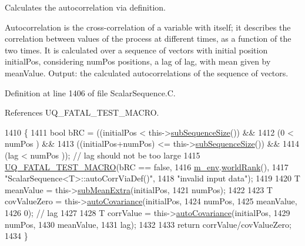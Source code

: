 Calculates the autocorrelation via definition. 

Autocorrelation is the cross-\/correlation of a variable with itself; it describes the correlation between values of the process at different times, as a function of the two times. It is calculated over a sequence of vectors with initial position {\ttfamily initial\-Pos}, considering {\ttfamily num\-Pos} positions, a lag of {\ttfamily lag}, with mean given by {\ttfamily mean\-Value}. Output\-: the calculated autocorrelations of the sequence of vectors. 

Definition at line 1406 of file Scalar\-Sequence.\-C.



References U\-Q\-\_\-\-F\-A\-T\-A\-L\-\_\-\-T\-E\-S\-T\-\_\-\-M\-A\-C\-R\-O.


\begin{DoxyCode}
1410 \{
1411   \textcolor{keywordtype}{bool} bRC = ((initialPos          <  this->\hyperlink{class_q_u_e_s_o_1_1_scalar_sequence_a0288ea295eedc216a1617b3286f6f3a0}{subSequenceSize}()) &&
1412               (0                   <  numPos                 ) &&
1413               ((initialPos+numPos) <= this->\hyperlink{class_q_u_e_s_o_1_1_scalar_sequence_a0288ea295eedc216a1617b3286f6f3a0}{subSequenceSize}()) &&
1414               (lag                 <  numPos                 )); \textcolor{comment}{// lag should not be too large}
1415   \hyperlink{_defines_8h_a56d63d18d0a6d45757de47fcc06f574d}{UQ\_FATAL\_TEST\_MACRO}(bRC == \textcolor{keyword}{false},
1416                       \hyperlink{class_q_u_e_s_o_1_1_scalar_sequence_a71618cd6351b29361b437af68447a4c8}{m\_env}.\hyperlink{class_q_u_e_s_o_1_1_base_environment_a78b57112bbd0e6dd0e8afec00b40ffa7}{worldRank}(),
1417                       \textcolor{stringliteral}{"ScalarSequence<T>::autoCorrViaDef()"},
1418                       \textcolor{stringliteral}{"invalid input data"});
1419 
1420   T meanValue = this->\hyperlink{class_q_u_e_s_o_1_1_scalar_sequence_a65e9208ee2d0443ad28b29141297153c}{subMeanExtra}(initialPos,
1421                                    numPos);
1422 
1423   T covValueZero = this->\hyperlink{class_q_u_e_s_o_1_1_scalar_sequence_ae923359502fc1caf5802cd42d5ad646a}{autoCovariance}(initialPos,
1424                                         numPos,
1425                                         meanValue,
1426                                         0); \textcolor{comment}{// lag}
1427 
1428   T corrValue = this->\hyperlink{class_q_u_e_s_o_1_1_scalar_sequence_ae923359502fc1caf5802cd42d5ad646a}{autoCovariance}(initialPos,
1429                                      numPos,
1430                                      meanValue,
1431                                      lag);
1432 
1433   \textcolor{keywordflow}{return} corrValue/covValueZero;
1434 \}
\end{DoxyCode}
